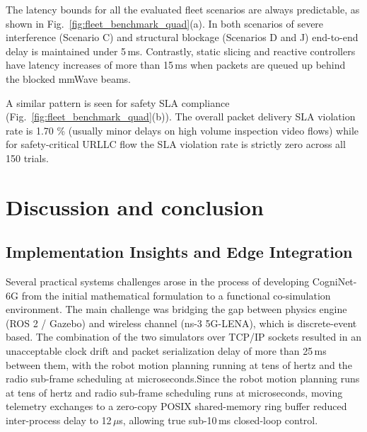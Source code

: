 \documentclass[twocolumn,10pt,twoside]{article}
\begin{document}
The latency bounds for all the evaluated fleet scenarios are always predictable, as shown in Fig.~\ref{fig:fleet_benchmark_quad}(a). In both scenarios of severe interference (Scenario C) and structural blockage (Scenarios D and J) end-to-end delay is maintained under 5\,ms. Contrastly, static slicing and reactive controllers have latency increases of more than 15\,ms when packets are queued up behind the blocked mmWave beams.

A similar pattern is seen for safety SLA compliance (Fig.~\ref{fig:fleet_benchmark_quad}(b)). The overall packet delivery SLA violation rate is 1.70 \% (usually minor delays on high volume inspection video flows) while for safety-critical URLLC flow the SLA violation rate is strictly zero across all 150 trials.

\section{Discussion and conclusion}
\subsection{Implementation Insights and Edge Integration}
Several practical systems challenges arose in the process of developing CogniNet-6G from the initial mathematical formulation to a functional co-simulation environment. The main challenge was bridging the gap between physics engine (ROS 2 / Gazebo) and wireless channel (ns-3 5G-LENA), which is discrete-event based. The combination of the two simulators over TCP/IP sockets resulted in an unacceptable clock drift and packet serialization delay of more than 25\,ms between them, with the robot motion planning running at tens of hertz and the radio sub-frame scheduling at microseconds.Since the robot motion planning runs at tens of hertz and radio sub-frame scheduling runs at microseconds, moving telemetry exchanges to a zero-copy POSIX shared-memory ring buffer reduced inter-process delay to 12\,$\mu$s, allowing true sub-10\,ms closed-loop control.
\end{document}
